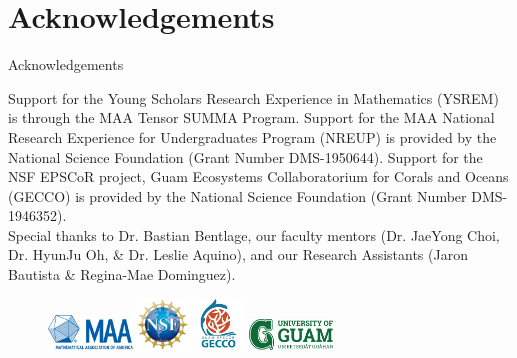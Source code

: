 \documentclass{beamer}
\begin{document}
\section{Acknowledgements}
\begin{frame}{Acknowledgements}
    \begin{center}
        Support for the Young Scholars Research Experience in Mathematics (YSREM)  is through the MAA Tensor SUMMA Program. Support for the MAA National Research Experience for Undergraduates Program (NREUP) is provided by the National Science Foundation (Grant Number DMS-1950644). Support for the NSF EPSCoR project, Guam Ecosystems Collaboratorium for Corals and Oceans (GECCO) is provided by the National Science Foundation (Grant Number DMS-1946352). \\
    \vspace{.2cm}
    \small{Special thanks to Dr. Bastian Bentlage, our faculty mentors (Dr. JaeYong Choi, Dr. HyunJu Oh, \& Dr. Leslie Aquino), and our Research Assistants (Jaron Bautista \& Regina-Mae Dominguez).}
    
    \begin{figure}
        \includegraphics[width = 0.20\textwidth]{Figures/MAA_logo_PMS286.jpg}
        \label{MAA}
        \includegraphics[width = 0.12\textwidth]{Figures/NSF_4-Color_bitmap_Logo.png}
        \label{NSF}
        \includegraphics[width = 0.12\textwidth]{Figures/epscor.jpeg}
        \label{epscor}
        \includegraphics[width = 0.20\textwidth]{Figures/UOG-horizontal.png}
        \label{uog}
    \end{figure}
    \end{center}
\end{frame}
\end{document}
